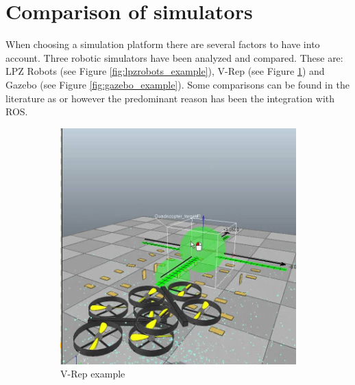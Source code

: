\section{Comparison of simulators} %
\label{sec:sim_comparison_of_simulators}
When choosing a simulation platform there are several factors to have into account.
Three robotic simulators have been analyzed and compared. 
These are: LPZ Robots \cite{lpzrobots} (see Figure \ref{fig:lpzrobots_example}), V-Rep \cite{vrep} (see Figure \ref{fig:vrep_example}) and Gazebo \cite{gazebo} (see Figure \ref{fig:gazebo_example}).
Some comparisons can be found in the literature as \cite{nogueiracomparative} or \cite{staranowicz2011survey} however the predominant reason has been the integration with ROS.

\begin{figure}[hb!]
  \begin{subfigure}{.33\textwidth}
    \centering
    \includegraphics[width=.95\linewidth]{figures/vrep_example}
    \caption{V-Rep example}
    \label{fig:vrep_example}
  \end{subfigure}%
  \begin{subfigure}{.33\textwidth}
    \centering

\end{subfigure}
\end{figure}
